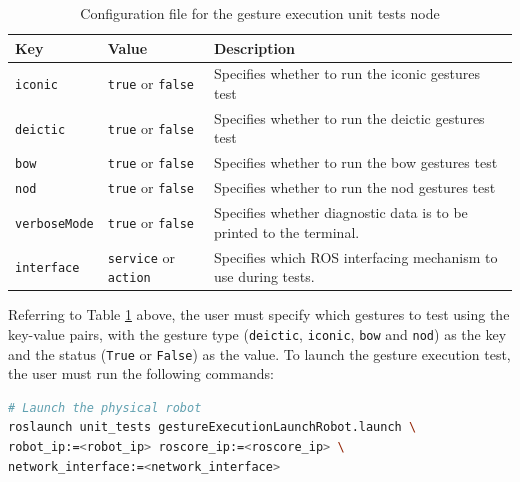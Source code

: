 \documentclass{CSSRforAfrica}
\begin{document}
\begin{longtable}[c]{|l|p{1.5cm}|p{7cm}|}
    \caption{Configuration file for the gesture execution unit tests node} \label{tab:unit_tests_config_file}\\
    \hline
    \rowcolor{gray!30}
    \small{\textbf{Key}} & \small{\textbf{Value}} & \small{\textbf{Description}} \\ \hline
    \endhead %

    
\small{\texttt{iconic}} & \small{\texttt{true}} or \texttt{false} & \small{Specifies whether to run the iconic gestures test} \\ \hline

\small{\texttt{deictic}} & \small{\texttt{true}} or \texttt{false} & \small{Specifies whether to run the deictic gestures test} \\ \hline
 
\small{\texttt{bow}} & \small{\texttt{true}} or \texttt{false} & \small{Specifies whether to run the bow gestures test} \\ \hline
    
\small{\texttt{nod}} & \small{\texttt{true}} or \texttt{false} & \small{Specifies whether to run the nod gestures test} \\ \hline
    
 \small{\texttt{verboseMode}} & \small{\texttt{true}} or \texttt{false} & \small{Specifies whether diagnostic data is to be printed to the terminal.} \\ \hline

 \small{\texttt{interface}} & \small{\texttt{service}} or \texttt{action} & \small{Specifies which ROS interfacing mechanism to use during tests.} \\ \hline


\end{longtable}


Referring to Table \ref{tab:unit_tests_config_file} above, the user must specify which gestures to test using the key-value pairs, with the gesture type (\texttt{deictic}, \texttt{iconic}, \texttt{bow} and \texttt{nod}) as the key and the status (\texttt{True} or \texttt{False}) as the value. To launch the gesture execution test, the user must run the following commands:

\begin{lstlisting}[style=withoutNumbering, language=bash]
# Launch the physical robot
roslaunch unit_tests gestureExecutionLaunchRobot.launch \
robot_ip:=<robot_ip> roscore_ip:=<roscore_ip> \
network_interface:=<network_interface>
\end{lstlisting}
\end{document}
